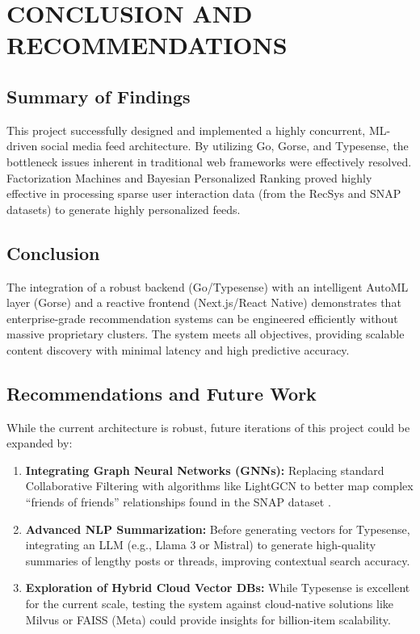 \chapter{CONCLUSION AND RECOMMENDATIONS}
\clearpage

\section{Summary of Findings}
This project successfully designed and implemented a highly concurrent, ML-driven social media feed architecture. By utilizing Go, Gorse, and Typesense, the bottleneck issues inherent in traditional web frameworks were effectively resolved. Factorization Machines and Bayesian Personalized Ranking proved highly effective in processing sparse user interaction data (from the RecSys \cite{recsys2020} and SNAP \cite{snap2014} datasets) to generate highly personalized feeds.

\section{Conclusion}
The integration of a robust backend (Go/Typesense) with an intelligent AutoML layer (Gorse) and a reactive frontend (Next.js/React Native) demonstrates that enterprise-grade recommendation systems can be engineered efficiently without massive proprietary clusters. The system meets all objectives, providing scalable content discovery with minimal latency and high predictive accuracy.

\section{Recommendations and Future Work}
While the current architecture is robust, future iterations of this project could be expanded by:
\begin{enumerate}
    \item \textbf{Integrating Graph Neural Networks (GNNs):} Replacing standard Collaborative Filtering with algorithms like LightGCN to better map complex ``friends of friends'' relationships found in the SNAP dataset \cite{snap2014}.
    \item \textbf{Advanced NLP Summarization:} Before generating vectors for Typesense, integrating an LLM (e.g., Llama 3 or Mistral) to generate high-quality summaries of lengthy posts or threads, improving contextual search accuracy.
    \item \textbf{Exploration of Hybrid Cloud Vector DBs:} While Typesense is excellent for the current scale, testing the system against cloud-native solutions like Milvus or FAISS (Meta) could provide insights for billion-item scalability.
\end{enumerate}
